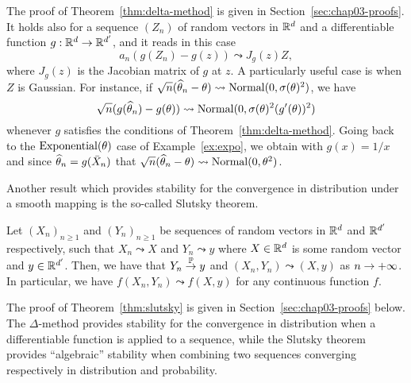 The proof of Theorem~\ref{thm:delta-method} is given in Section~\ref{sec:chap03-proofs}.
It holds also for a sequence $(Z_n)$ of random vectors in $\mathbb R^d$ and a differentiable function $g : \mathbb R^d \rightarrow \mathbb R^{d'}$, and it reads in this case
\begin{equation}
	\label{eq:delta-method-vector}
	a_n (g(Z_n) - g(z)) \leadsto J_g(z) Z,
\end{equation}
where $J_g(z)$ is the Jacobian matrix of $g$ at $z$.
A particularly useful case is when $Z$ is Gaussian.
For instance, if $\sqrt n (\widehat \theta_n - \theta) \leadsto \operatorname{Normal}(0, \sigma(\theta)^2)$, we have
\begin{equation*}
	\sqrt n (g(\widehat \theta_n) - g(\theta)) \leadsto 
	\operatorname{Normal}(0, \sigma(\theta)^2 (g'(\theta))^2)
\end{equation*}
whenever $g$ satisfies the conditions of Theorem~\ref{thm:delta-method}.
Going back to the $\operatorname{Exponential}(\theta)$ case of Example~\ref{ex:expo}, we obtain with $g(x) = 1 / x$ and since $\widehat \theta_n = g(\bar X_n)$ that $\sqrt n (\widehat \theta_n - \theta) \leadsto \operatorname{Normal}(0, \theta^2)$.

Another result which provides stability for the convergence in distribution under a smooth mapping is the so-called Slutsky theorem.%
\begin{theorem}[Slutsky]
	\label{thm:slutsky}
	Let $(X_n)_{n \geq 1}$ and $(Y_n)_{n \geq 1}$ be sequences of random vectors in $\mathbb R^d$  and $\mathbb R^{d'}$ respectively, such that $X_n \leadsto X$ and $Y_n \leadsto y$ where $X \in \mathbb R^d$ is some random vector and $y \in \mathbb R^{d'}$.
	Then, we have that $Y_n \overset{\mathbb P}{\rightarrow} y$ and $(X_n, Y_n) \leadsto (X, y)$ as $n \rightarrow +\infty$. In particular, we have $f(X_n, Y_n) \leadsto f(X, y)$ for any continuous function $f$.
\end{theorem}
The proof of Theorem~\ref{thm:slutsky} is given in Section~\ref{sec:chap03-proofs} below.
The $\Delta$-method provides stability for the convergence in distribution when a differentiable function is applied to a sequence, while the Slutsky theorem provides ``algebraic'' stability when combining two sequences converging respectively in distribution and probability.

